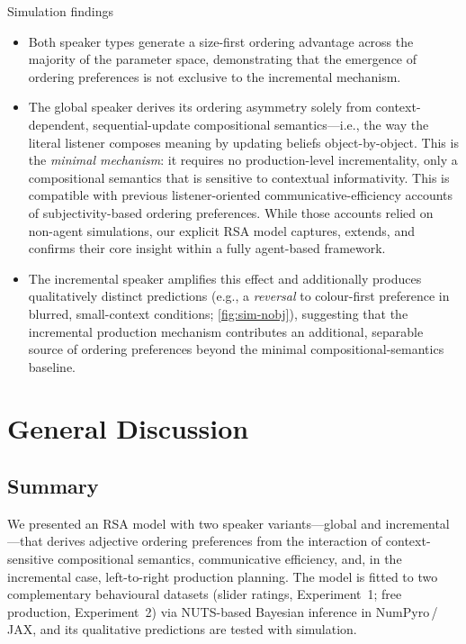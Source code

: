 \documentclass[11pt, a4paper]{article}
\begin{document}
\begin{discussbox}{Simulation findings}
\begin{itemize}[leftmargin=*]
  \item Both speaker types generate a size-first ordering advantage across the majority of the parameter space, demonstrating that the emergence of ordering preferences is not exclusive to the incremental mechanism.
  \item The global speaker derives its ordering asymmetry solely from context-dependent, sequential-update compositional semantics---i.e., the way the literal listener composes meaning by updating beliefs object-by-object.  This is the \emph{minimal mechanism}: it requires no production-level incrementality, only a compositional semantics that is sensitive to contextual informativity.  This is compatible with previous listener-oriented communicative-efficiency accounts of subjectivity-based ordering preferences.  While those accounts relied on non-agent simulations, our explicit RSA model captures, extends, and confirms their core insight within a fully agent-based framework.
  \item The incremental speaker amplifies this effect and additionally produces qualitatively distinct predictions (e.g., a \emph{reversal} to colour-first preference in blurred, small-context conditions; \cref{fig:sim-nobj}), suggesting that the incremental production mechanism contributes an additional, separable source of ordering preferences beyond the minimal compositional-semantics baseline.
\end{itemize}
\end{discussbox}


\newpage


\section{General Discussion}
\label{sec:discussion}

\subsection{Summary}

We presented an RSA model with two speaker variants---global and incremental---that derives adjective ordering preferences from the interaction of context-sensitive compositional semantics, communicative efficiency, and, in the incremental case, left-to-right production planning.  The model is fitted to two complementary behavioural datasets (slider ratings, Experiment~1; free production, Experiment~2) via NUTS-based Bayesian inference in NumPyro\,/\,JAX, and its qualitative predictions are tested with simulation.
\end{document}
